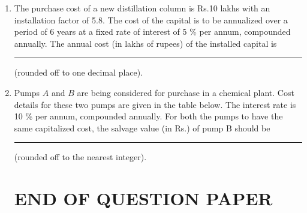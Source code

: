 \documentclass[journal,12pt,onecolumn]{IEEEtran}
\theoremstyle{remark}
\begin{document}
\begin{enumerate}
    \hfill{}
    
    \item The purchase cost of a new distillation column is Rs.10 lakhs with an installation factor of 5.8. The cost of the capital is to be annualized over a period of 6 years at a fixed rate of interest of 5 \% per annum, compounded annually. The annual cost (in lakhs of rupees) of the installed capital is \rule{40pt}{0.1mm}(rounded off to one decimal place).

    \hfill{}
    \item Pumps $A$ and $B$ are being considered for purchase in a chemical plant. Cost details for these two pumps are given in the table below. The interest rate is 10 \% per annum, compounded annually. For both the pumps to have the same capitalized cost, the salvage value (in Rs.) of pump B should be \rule{30pt}{0.1mm}(rounded off to the nearest integer).

\hfill{}


\section*{END OF QUESTION PAPER}














\end{enumerate}
\end{document}
